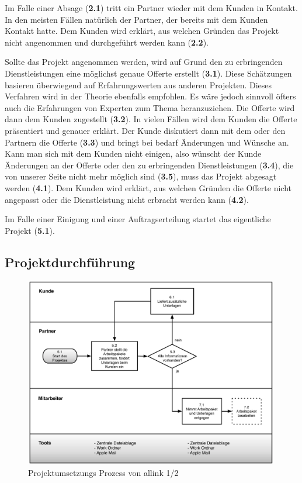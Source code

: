 Im Falle einer Absage (\textbf{2.1}) tritt ein Partner wieder mit dem Kunden in Kontakt.
In den meisten Fällen natürlich der Partner, der bereits mit dem Kunden Kontakt
hatte. Dem Kunden wird erklärt, aus welchen Gründen das Projekt nicht angenommen
und durchgeführt werden kann (\textbf{2.2}).

Sollte das Projekt angenommen werden, wird auf Grund den zu erbringenden
Dienstleistungen eine möglichst genaue Offerte erstellt (\textbf{3.1}). Diese Schätzungen
basieren überwiegend auf Erfahrungswerten aus anderen Projekten. Dieses Verfahren
wird in der Theorie ebenfalls empfohlen. Es wäre jedoch sinnvoll öfters auch
die Erfahrungen von Experten zum Thema heranzuziehen. 
Die Offerte wird dann dem Kunden zugestellt (\textbf{3.2}). In vielen Fällen wird dem Kunden
die Offerte präsentiert und genauer erklärt.
Der Kunde diskutiert dann mit dem oder den Partnern die Offerte (\textbf{3.3}) und bringt
bei bedarf Änderungen und Wünsche an.
Kann man sich mit dem Kunden nicht einigen, also wünscht der Kunde Änderungen
an der Offerte oder den zu erbringenden Dienstleistungen (\textbf{3.4}), die von unserer Seite
nicht mehr möglich sind (\textbf{3.5}), muss das Projekt abgesagt werden (\textbf{4.1}).
Dem Kunden wird erklärt, aus welchen Gründen die Offerte nicht angepasst oder
die Dienstleistung nicht erbracht werden kann (\textbf{4.2}).

Im Falle einer Einigung und einer Auftragserteilung startet das eigentliche
Projekt (\textbf{5.1}).

\clearpage

\subsection{Projektdurchführung}

\begin{figure}[p]
\begin{center}
\includegraphics[width=0.99\textwidth,angle=0]{./bilder/analyse/02_ist_prozesse_arbeit_01.pdf}
\caption[Projektumsetzungs Prozess von allink 1/2]{Projektumsetzungs 
    Prozess von allink 1/2\footnotemark}
\label{pic:02_ist_prozesse_arbeit_01}
\end{center}
\end{figure}

